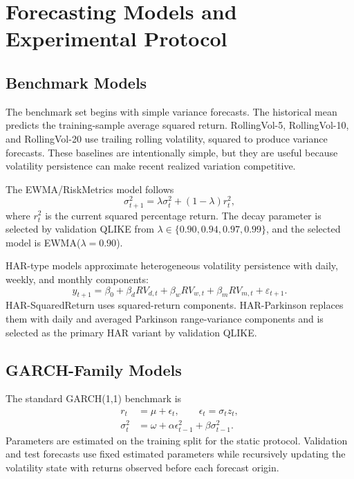 \section{Forecasting Models and Experimental Protocol}

\subsection{Benchmark Models}

The benchmark set begins with simple variance forecasts. The historical mean predicts the training-sample average squared return. RollingVol-5, RollingVol-10, and RollingVol-20 use trailing rolling volatility, squared to produce variance forecasts. These baselines are intentionally simple, but they are useful because volatility persistence can make recent realized variation competitive.

The EWMA/RiskMetrics model follows
\begin{equation}
\sigma_{t+1}^{2} = \lambda\sigma_t^2+(1-\lambda)r_t^2,
\end{equation}
where \(r_t^2\) is the current squared percentage return. The decay parameter is selected by validation QLIKE from \(\lambda\in\{0.90,0.94,0.97,0.99\}\), and the selected model is EWMA(\(\lambda=0.90\)).

HAR-type models approximate heterogeneous volatility persistence with daily, weekly, and monthly components:
\begin{equation}
y_{t+1} = \beta_0+\beta_d RV_{d,t}+\beta_w RV_{w,t}+\beta_m RV_{m,t}+\varepsilon_{t+1}.
\end{equation}
HAR-SquaredReturn uses squared-return components. HAR-Parkinson replaces them with daily and averaged Parkinson range-variance components and is selected as the primary HAR variant by validation QLIKE.

\subsection{GARCH-Family Models}

The standard GARCH(1,1) benchmark is
\begin{align}
r_t &= \mu+\epsilon_t,\qquad \epsilon_t=\sigma_t z_t,\\
\sigma_t^2 &= \omega+\alpha\epsilon_{t-1}^{2}+\beta\sigma_{t-1}^{2}.
\end{align}
Parameters are estimated on the training split for the static protocol. Validation and test forecasts use fixed estimated parameters while recursively updating the volatility state with returns observed before each forecast origin.

